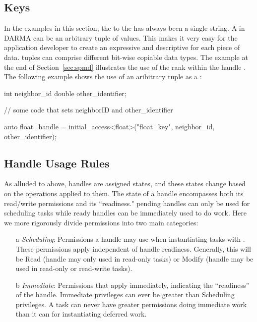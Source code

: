\subsection{Keys}
\label{subsec:keys}
In the examples in this section, the  to the
\ahandleT has always been a single string. 
A  in DARMA 
can be an arbitrary \gls{tuple} of values.  This 
makes it very easy for the application developer to create an expressive
and descriptive  for each piece of data.  \Glspl{tuple} can comprise
different bit-wise copiable data types.  The example at the end of
Section~\ref{sec:spmd} illustrates the use of the \gls{rank} within the
\gls{handle} .  The following example shows the use of an
aribitrary \gls{tuple} as a :
\begin{CppCode}
  int neighbor_id
  double other_identifier;

  // some code that sets neighborID and other_identifier
  
  auto float_handle = initial_access<float>("float_key", 
                                            neighbor_id, 
                                            other_identifier);
\end{CppCode}

\subsection{Handle Usage Rules}
\label{sec:handlerules}
As alluded to above, \glspl{handle} are assigned states, and these states change 
based on the operations applied to them.  
The state of a \gls{handle} encompasses both its read/write permissions and its ``readiness."
\Gls{pending} \glspl{handle} can only be used for scheduling \glspl{task} while
\gls{ready} \glspl{handle} can be immediately used to do work.
Here we more rigorously divide permissions into two main categories: 
\begin{itemize}
\item[a] {\it Scheduling}: Permissions a handle may use when instantiating tasks with .
These permissions apply independent of handle readiness. 
Generally, this will be Read (handle may only used in read-only tasks) or Modify (handle may be used in read-only or read-write tasks). 
\item[b] {\it Immediate}: Permissions that apply immediately, indicating the ``readiness'' of the handle.  Immediate privileges can ever be greater than Scheduling privileges.
A task can never have greater permissions doing immediate work than it can for instantiating deferred work.
\end{itemize}

